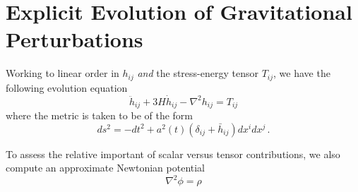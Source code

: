 \documentclass{revtex4}
\begin{document}
\section{Explicit Evolution of Gravitational Perturbations}
Working to linear order in $h_{ij}$ \emph{and} the stress-energy tensor $T_{ij}$, we have the following evolution equation
\begin{equation}
  \ddot{h}_{ij} + 3H\dot{h}_{ij} - \nabla^2h_{ij} = T_{ij}
\end{equation}
where the metric is taken to be of the form
\begin{equation}
  ds^2 = -dt^2 + a^2(t)\left(\delta_{ij} + \bar{h}_{ij}\right)dx^idx^j \, .
\end{equation}

To assess the relative important of scalar versus tensor contributions, we also compute an approximate Newtonian potential
\begin{equation}
  \nabla^2\phi = \rho
\end{equation}
\end{document}
